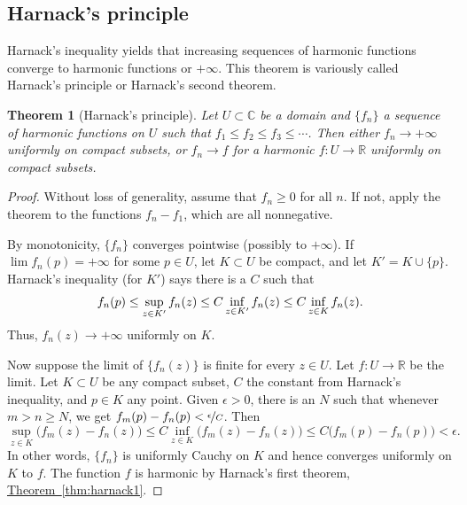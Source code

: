 \documentclass[12pt,openany]{book}
\newcommand{\avoidbreak}{\postdisplaypenalty=100}
\newcommand{\C}{{\mathbb{C}}}
\newcommand{\R}{{\mathbb{R}}}
\theoremstyle{plain}
\newtheorem{thm}{Theorem}[section]
\theoremstyle{remark}
\theoremstyle{definition}
\theoremstyle{exercise}
\theoremstyle{example}
\newcommand{\thmref}[1]{\hyperref[#1]{Theorem~\ref*{#1}}}
\begin{document}
\subsection{Harnack's principle}

Harnack's inequality yields that increasing 
sequences of harmonic functions converge to harmonic functions
or $+\infty$.
This theorem is variously called
Harnack's principle or Harnack's second theorem.

\begin{thm}[Harnack's principle]
Let $U \subset \C$ be a domain and $\{ f_n \}$ a sequence of
harmonic functions on $U$ such that $f_1 \leq f_2 \leq f_3 \leq \cdots$.
Then either $f_n \to +\infty$ uniformly on compact subsets, or
$f_n \to f$ for a harmonic $f \colon U \to \R$ uniformly on compact subsets.
\end{thm}

\begin{proof}
Without loss of generality, assume that $f_n \geq 0$ for all $n$.
If not, apply the theorem to the functions $f_n-f_1$,
which are all nonnegative.

By monotonicity, $\{f_n\}$ converges pointwise (possibly to $+\infty$).
If $\lim f_n(p) = +\infty$ for some $p \in U$, let $K \subset U$
be compact, and let $K' = K \cup \{ p \}$.
Harnack's inequality (for $K'$) says there is a $C$ such that
\begin{equation*}
f_n(p) \leq \sup_{z \in K'} f_n(z) \leq C \inf_{z\in K'} f_n(z) \leq C \inf_{z\in K} f_n(z) .
\avoidbreak
\end{equation*}
Thus, $f_n(z) \to +\infty$ uniformly on $K$.

Now suppose the limit of $\{ f_n(z) \}$ is finite
for every $z \in U$.  Let $f \colon U \to \R$ be the limit.
Let $K \subset U$ be any compact subset,
$C$ the constant from Harnack's inequality, and $p \in K$ any point.
Given $\epsilon > 0$,
there is an $N$
such that whenever $m > n \geq N$, we get
$f_m(p)-f_n(p) < \nicefrac{\epsilon}{C}$.  Then
\begin{equation*}
\sup_{z \in K} \bigl( f_m(z)- f_n(z) \bigr) \leq
C \inf_{z\in K} \bigl( f_m(z)-f_n(z) \bigr)
\leq
C \bigl( f_m(p)-f_n(p) \bigr)
< \epsilon .
\end{equation*}
In other words, $\{ f_n \}$ is uniformly Cauchy on $K$ and hence converges
uniformly on $K$ to $f$.  The function $f$ is harmonic by
Harnack's first theorem, 
\thmref{thm:harnack1}.
\end{proof}
\end{document}
